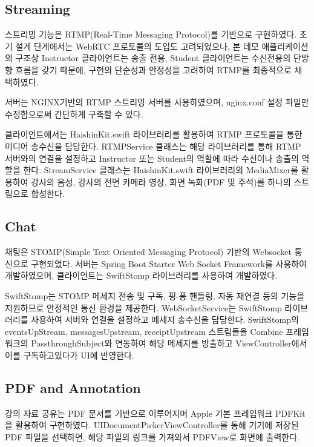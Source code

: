 \documentclass[pdflatex,sn-mathphys-num]{sn-jnl}%
\theoremstyle{thmstyleone}%
\theoremstyle{thmstyletwo}%
\theoremstyle{thmstylethree}%
\begin{document}
\subsection{Streaming}\label{subsec5}

스트리밍 기능은 RTMP(Real-Time Messaging Protocol)\cite{RTMP}를 기반으로 구현하였다. 초기 설계 단계에서는 WebRTC 프로토콜의 도입도 고려되었으나, 본 데모 애플리케이션의 구조상 Instructor 클라이언트는 송출 전용, Student 클라이언트는 수신전용의 단방향 흐름을 갖기 때문에, 구현의 단순성과 안정성을 고려하여 RTMP를 최종적으로 채택하였다.

서버는 NGINX\cite{NGINX}기반의 RTMP 스트리밍 서버를 사용하였으며, nginx.conf 설정 파일만 수정함으로써 간단하게 구축할 수 있다.

클라이언트에서는 HaishinKit.swift\cite{HaishinKit} 라이브러리를 활용하여 RTMP 프로토콜을 통한 미디어 송수신을 담당한다. RTMPService 클래스는 해당 라이브러리를 통해 RTMP 서버와의 연결을 설정하고 Instructor 또는 Student의 역할에 따라 수신이나 송출의 역할을 한다. StreamService 클래스는 HaishinKit.swift 라이브러리의 MediaMixer를 활용하여 강사의 음성, 강사의 전면 카메라 영상, 화면 녹화(PDF 및 주석)를 하나의 스트림으로 합성한다.

\subsection{Chat}\label{subsec6}

채팅은 STOMP(Simple Text Oriented Messaging Protocol)\cite{STOMP} 기반의 Websocket 통신으로 구현되었다. 서버는 Spring Boot Starter Web Socket Framework를 사용하여 개발하였으며, 클라이언트는 SwiftStomp\cite{SwiftStomp} 라이브러리를 사용하여 개발하였다.

SwiftStomp는 STOMP 메세지 전송 및 구독, 핑-퐁 핸들링, 자동 재연결 등의 기능을 지원하므로 안정적인 통신 환경을 제공한다. WebSocketService는 SwiftStomp 라이브러리를 사용하여 서버와 연결을 설정하고 메세지 송수신을 담당한다. SwiftStomp의 eventsUpStream, messagesUpstream, receiptUpstream 스트림들을 Combine 프레임워크의 PassthroughSubject와 연동하여 해당 메세지를 방출하고 ViewController에서 이를 구독하고있다가 UI에 반영한다.

\subsection{PDF and Annotation}\label{subsec7}

강의 자료 공유는 PDF 문서를 기반으로 이루어지며 Apple 기본 프레임워크 PDFKit\cite{PDFKit}을 활용하여 구현하였다. UIDocumentPickerViewController를 통해 기기에 저장된 PDF 파일을 선택하면, 해당 파일의 링크를 가져와서 PDFView로 화면에 출력한다.
\end{document}
